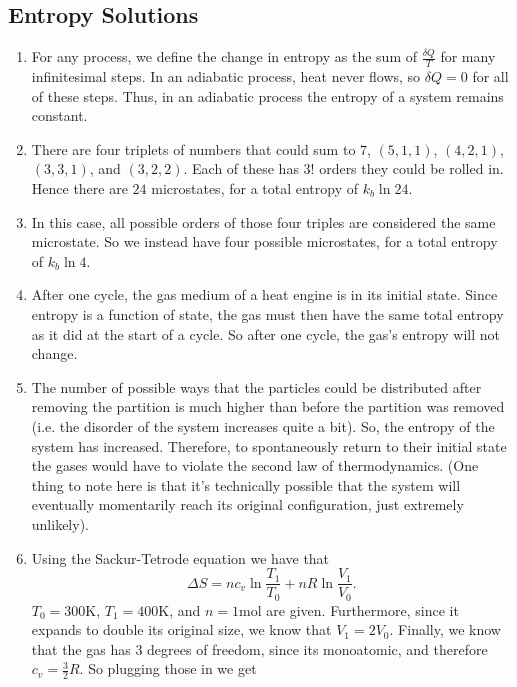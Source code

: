 \subsection{Entropy Solutions}
\begin{enumerate}
    \item For any process, we define the change in entropy as the sum of $\frac{\delta Q}{T}$ for many infinitesimal steps. In an adiabatic process, heat never flows, so $\delta Q = 0$ for all of these steps. Thus, in an adiabatic process the entropy of a system remains constant.
    \item There are four triplets of numbers that could sum to $7$, $(5,1,1)$, $(4,2,1)$, $(3,3,1)$, and $(3,2,2)$. Each of these has $3!$ orders they could be rolled in. Hence there are $24$ microstates, for a total entropy of $k_{b}\ln{24}$.
    \item In this case, all possible orders of those four triples are considered the same microstate. So we instead have four possible microstates, for a total entropy of $k_{b}\ln{4}$.
    \item After one cycle, the gas medium of a heat engine is in its initial state. Since entropy is a function of state, the gas must then have the same total entropy as it did at the start of a cycle. So after one cycle, the gas's entropy will not change.
    \item The number of possible ways that the particles could be distributed after removing the partition is much higher than before the partition was removed (i.e. the disorder of the system increases quite a bit). So, the entropy of the system has increased. Therefore, to spontaneously return to their initial state the gases would have to violate the second law of thermodynamics. (One thing to note here is that it's technically possible that the system will eventually momentarily reach its original configuration, just extremely unlikely).
    \item Using the Sackur-Tetrode equation we have that 
    \begin{equation*}
        \Delta S = nc_{v}\ln{\frac{T_1}{T_0}} + nR\ln{\frac{V_1}{V_0}}.
    \end{equation*}
    $T_0 = 300\textrm{K}$, $T_1 = 400\textrm{K}$, and $n = 1\textrm{mol}$ are given. Furthermore, since it expands to double its original size, we know that $V_1 = 2V_0$. Finally, we know that the gas has 3 degrees of freedom, since its monoatomic, and therefore $c_v = \frac{3}{2}R$. So plugging those in we get
    \begin{gather*}

\end{gather*}
\end{enumerate}
